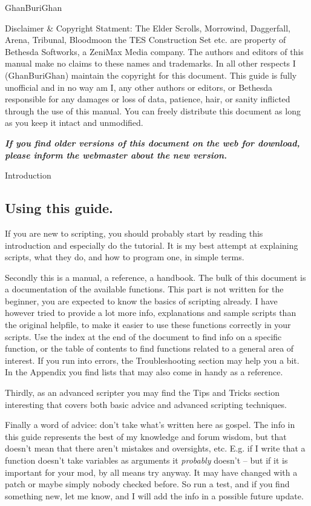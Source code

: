 \documentclass[
]{article}
\begin{document}
GhanBuriGhan

Disclaimer \& Copyright Statment: The Elder Scrolls, Morrowind,
Daggerfall, Arena, Tribunal, Bloodmoon the TES Construction Set etc. are
property of Bethesda Softworks, a ZeniMax Media company. The authors and
editors of this manual make no claims to these names and trademarks. In
all other respects I (GhanBuriGhan) maintain the copyright for this
document. This guide is fully unofficial and in no way am I, any other
authors or editors, or Bethesda responsible for any damages or loss of
data, patience, hair, or sanity inflicted through the use of this
manual. You can freely distribute this document as long as you keep it
intact and unmodified.

\emph{\textbf{If you find older versions of this document on the web for
download, please inform the webmaster about the new version.}}

\protect\hypertarget{_Toc53412549}{}{}Introduction

\hypertarget{using-this-guide.}{%
\subsection{Using this guide.}\label{using-this-guide.}}

If you are new to scripting, you should probably start by reading this
introduction and especially do the tutorial. It is my best attempt at
explaining scripts, what they do, and how to program one, in simple
terms.

Secondly this is a manual, a reference, a handbook. The bulk of this
document is a documentation of the available functions. This part is not
written for the beginner, you are expected to know the basics of
scripting already. I have however tried to provide a lot more info,
explanations and sample scripts than the original helpfile, to make it
easier to use these functions correctly in your scripts. Use the index
at the end of the document to find info on a specific function, or the
table of contents to find functions related to a general area of
interest. If you run into errors, the Troubleshooting section may help
you a bit. In the Appendix you find lists that may also come in handy as
a reference.

Thirdly, as an advanced scripter you may find the Tips and Tricks
section interesting that covers both basic advice and advanced scripting
techniques.

Finally a word of advice: don't take what's written here as gospel. The
info in this guide represents the best of my knowledge and forum wisdom,
but that doesn't mean that there aren't mistakes and oversights, etc.
E.g. if I write that a function doesn't take variables as arguments it
\emph{probably} doesn't -- but if it is important for your mod, by all
means try anyway. It may have changed with a patch or maybe simply
nobody checked before. So run a test, and if you find something new, let
me know, and I will add the info in a possible future update.
\end{document}
